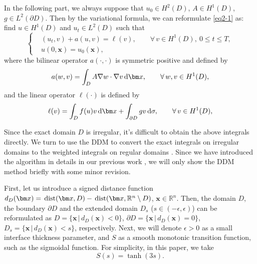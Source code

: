 \documentclass[3p,times]{elsarticle}
\numberwithin{equation}{section}
\newcommand{\dd}{\,{\rm d}}
\newcommand{\dist}{\,{\rm dist}}
\begin{document}

In the following part, we always suppose that $u_0\in H^2(D)$, $A\in H^1(D)$, $g\in L^2(\partial D)$. Then by the variational formula, we can reformulate \eqref{eq2-1} as: find $u \in H^1(D)$ and $u_t \in L^2(D)$ such that
\begin{equation}
	\label{eq2-2}
	\left\{\begin{split}
		&(u_t,v)+a(u,v)=\ell(v), \qquad \forall \,v \in H^1(D),\ 0 \leq t \leq T,\\
		&u(0,\bm x)=u_0(\bm x),
	\end{split}
	\right.
\end{equation}
where the bilinear operator $a(\cdot,\cdot)$ is symmetric positive and defined by
\begin{equation}
	\label{bilinear_operator}
	a(w,v)=\int_{D} A\nabla w\cdot\nabla v \dd \bm x, \qquad \forall\,w, v\in H^1(D),
\end{equation}
and the linear operator $\ell(\cdot)$ is defined by
\begin{equation}
	\label{linear_operator}
	\ell(v)=\int_{D} f(u)v\dd \bm x + \int_{\partial D} gv\dd \sigma,\qquad \forall\,  v\in H^1(D),
\end{equation}

Since the exact domain $D$ is irregular, it's difficult to obtain the above integrals directly. We turn to use the DDM to convert the exact integrals on irregular domains to the weighted integrals on regular domains \cite{BurgerElvetun2017}. Since we have introduced the algorithm in details in our previous work \cite{HaoJu2025}, we will only show the DDM method briefly with some minor revision.

First, let us introduce a signed distance function $d_D(\bm x)=\dist(\bm x,D)-\dist(\bm x,\mathbb{R}^n\setminus D)$, $\bm x \in \mathbb{R}^n$. Then, the domain $D$, the boundary $\partial D$ and the extended domain $D_{s}$ ($s \in (-\epsilon,\epsilon)$) can be reformulated as $D=\{\bm x\,|\,d_D(\bm x)<0 \}$, $\partial D=\{\bm x\,|\,d_D(\bm x)=0 \}$, $D_s=\{\bm x\,|\,d_D(\bm x)<s \}$, respectively. Next, we will denote $\epsilon>0$ as a small interface thickness parameter, and $S$ as a smooth monotonic transition function, such as the sigmoidal function. For simplicity, in this paper, we take
\begin{equation}
	S(s) =\tanh(3s).
\end{equation}
\end{document}
